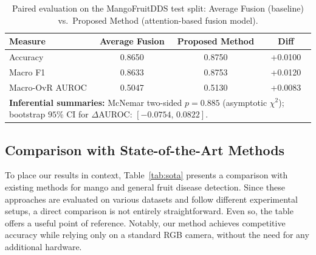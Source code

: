 \documentclass[utf8]{FrontiersinHarvard} %
\begin{document}
\begin{table}[h!]
    \centering
    \caption{Paired evaluation on the MangoFruitDDS test split: Average Fusion (baseline) vs.\ Proposed Method (attention-based fusion model).}
    \label{tab:paired_stats}
    \footnotesize
    \begin{tabular}{lccc}
        \toprule
        \textbf{Measure} & \textbf{Average Fusion} & \textbf{Proposed Method} & \textbf{Diff} \\
        \midrule
        Accuracy & 0.8650 & 0.8750 & +0.0100 \\
        Macro F1 & 0.8633 & 0.8753 & +0.0120 \\
        Macro-OvR AUROC & 0.5047 & 0.5130 & +0.0083 \\
        \midrule
        \multicolumn{4}{l}{\textbf{Inferential summaries:} McNemar two-sided $p{=}0.885$ (asymptotic $\chi^{2}$); bootstrap $95$\% CI for $\Delta$AUROC: $[-0.0754,\,0.0822]$.} \\
        \bottomrule
    \end{tabular}
\end{table}

\subsection{Comparison with State-of-the-Art Methods}
To place our results in context, Table~\ref{tab:sota} presents a comparison with existing methods for mango and general fruit disease detection. Since these approaches are evaluated on various datasets and follow different experimental setups, a direct comparison is not entirely straightforward. Even so, the table offers a useful point of reference. Notably, our method achieves competitive accuracy while relying only on a standard RGB camera, without the need for any additional hardware.
\end{document}
